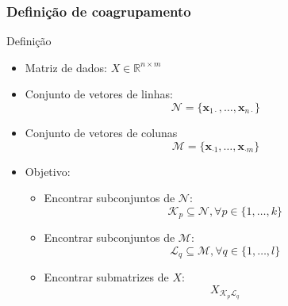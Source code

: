 \documentclass[10pt]{beamer}
\begin{document}



\begin{frame} [shrink=15]
  \frametitle{Definição de coagrupamento}
  \begin{block}{Definição}
    \begin{itemize}
      \item Matriz de dados: $X \in \mathbb{R}^{n \times m}$
      \item Conjunto de vetores de linhas:
        $$\mathcal{N} = \{ \mathbf{x}_{1 \cdot}, \dots, \mathbf{x}_{n \cdot} \}$$
      \item Conjunto de vetores de colunas
        $$\mathcal{M} = \{ \mathbf{x}_{\cdot 1}, \dots, \mathbf{x}_{\cdot m} \}$$
      \item Objetivo:
        \begin{itemize}
          \item Encontrar subconjuntos de $\mathcal{N}$:
            $$\mathcal{K}_p \subseteq \mathcal{N}, \forall p \in \{ 1, \dots, k\}$$
          \item Encontrar subconjuntos de $\mathcal{M}$:
            $$\mathcal{L}_q \subseteq \mathcal{M}, \forall q \in \{1, \dots, l\}$$
          \item Encontrar submatrizes de $X$:
            $$X_{\mathcal{K}_p \mathcal{L}_q}$$
        \end{itemize}
    \end{itemize}
  \end{block}
\end{frame}

\end{document}
